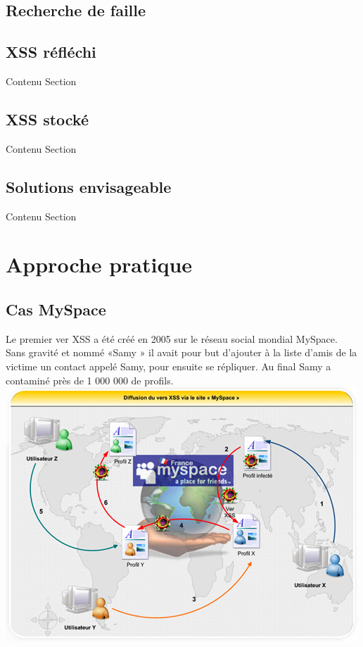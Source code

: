 \documentclass[a4paper,12pt]{report}
\begin{document}
		

		\newpage
	

	\section{Recherche de faille}

		

		\newpage

	

	\section{XSS réfléchi}
		Contenu Section 
		

		\newpage

	\section{XSS stocké}
		Contenu Section 
		

		\newpage
	\section{Solutions envisageable}
		Contenu Section 
		

		\newpage
	\chapter{Approche pratique} %
		
	\section{Cas MySpace}
Le premier ver XSS a été créé en 2005 sur le réseau social mondial MySpace. Sans gravité et nommé «Samy » il avait pour but d’ajouter à la liste d’amis de la victime un contact appelé Samy, pour ensuite se répliquer. Au final Samy a contaminé près de 1 000 000 de profils. \\

\includegraphics{images/versmyspace.jpg}\\
\end{document}
